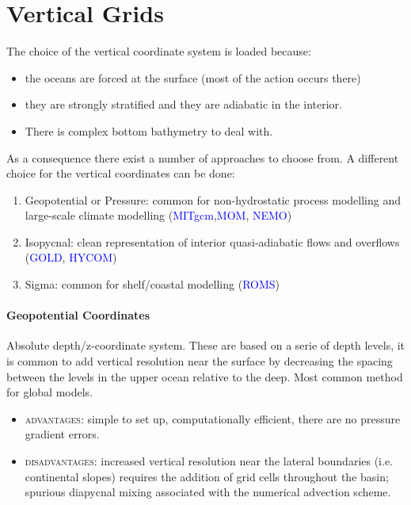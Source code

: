 \section{Vertical Grids}
The choice of the vertical coordinate system is loaded because:
\begin{itemize}
	\item the oceans are forced at the surface (most of the action occurs there)
	\item they are strongly stratified and they are adiabatic in the interior.
	\item There is complex bottom bathymetry to deal with.
\end{itemize}
As a consequence there exist a number of approaches to choose from. A different choice for the vertical coordinates can be done:
\begin{enumerate}
	\item Geopotential or Pressure: common for non-hydrostatic process modelling and large-scale climate modelling (\textcolor{Blue}{MITgcm},\textcolor{Blue}{MOM}, \textcolor{Blue}{NEMO})
	\item Isopycnal:  clean representation of interior quasi-adiabatic flows and overflows (\textcolor{Blue}{GOLD}, \textcolor{Blue}{HYCOM})
	\item Sigma: common for shelf/coastal modelling (\textcolor{Blue}{ROMS})
\end{enumerate}

\paragraph{Geopotential Coordinates}
Absolute depth/z-coordinate system. These are based on a serie of depth levels, it is common to add vertical resolution near the surface by decreasing the spacing between the levels in the upper ocean relative to the deep. Most common method for global models.
\begin{itemize}
	\item \textsc{advantages}: simple to set up, computationally efficient, there are no pressure gradient errors.
	\item \textsc{disadvantages}: increased vertical resolution near the lateral boundaries (i.e. continental slopes) requires the addition of grid cells throughout the basin; spurious diapycnal mixing associated with the numerical advection scheme.

\end{itemize}

